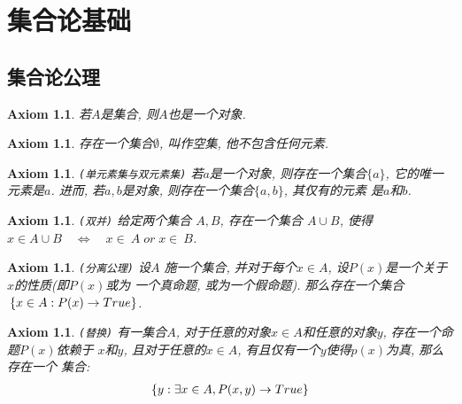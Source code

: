 \chapter{集合论基础}

\section{集合论公理}
\newtheorem{axiomOne}[theorem_root]{Axiom}
\begin{axiomOne}
    若$A$是集合, 则$A$也是一个对象.
\end{axiomOne}

\newtheorem{axiomTwo}[theorem_root]{Axiom}
\begin{axiomTwo}
    存在一个集合$\emptyset$, 叫作空集, 他不包含任何元素.
\end{axiomTwo}

\newtheorem{axiomThree}[theorem_root]{Axiom}
\begin{axiomThree}
    {\tt (单元素集与双元素集)}\quad
    若$a$是一个对象, 则存在一个集合$\{a\}$, 它的唯一元素是$a$.
    进而, 若$a, b$是对象, 则存在一个集合$\{a, b\}$, 其仅有的元素
    是$a$和$b$.
\end{axiomThree}

\newtheorem{axiomFour}[theorem_root]{Axiom}
\begin{axiomFour}
    {\tt (双并)\quad}
    给定两个集合 $A, B$, 存在一个集合 $A\cup B$, 
    使得$x\in A\cup B\quad\Longleftrightarrow\quad x\in~A\;or\; x\in~B$.
\end{axiomFour}

\newtheorem{axiomFive}[theorem_root]{Axiom}
\begin{axiomFive}
    {\tt(分离公理)\quad}
    设$A$ 施一个集合, 并对于每个$x\in A$, 设$P(x)$是一个关于$x$的性质(即$P(x)$或为
    一个真命题, 或为一个假命题). 那么存在一个集合$\,\{x\in A: P(x)\to {True}\}$.
\end{axiomFive}

\newtheorem{axiomSix}[theorem_root]{Axiom}
\begin{axiomSix}
    {\tt (替换)\quad}
    有一集合$A$, 对于任意的对象$x\in A$和任意的对象$y$, 存在一个命题$P(x)$依赖于
    $x$和$y$, 且对于任意的$x\in A$, 有且仅有一个$y$使得$p(x)$为真, 那么存在一个
    集合:
    \begin{align*}
    \{y: \exists x\in A, P(x,y)\to {True}\}
    \end{align*}
\end{axiomSix}

